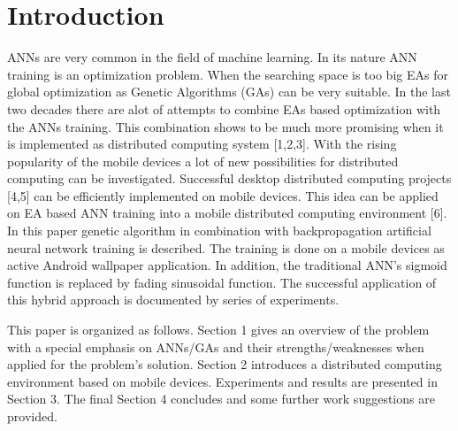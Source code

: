 \documentclass{llncs}
\begin{document}
\section{Introduction}
%
ANNs are very common in the field of machine learning. In its nature ANN training is an optimization problem. When the searching space is too big EAs for global optimization as Genetic Algorithms (GAs) can be very suitable. In the last two decades there are alot of attempts to combine EAs based optimization with the ANNs training. This combination shows to be much more promising when it is implemented as distributed computing system [1,2,3]. With the rising popularity of the mobile devices a lot of new possibilities for distributed computing can be investigated. Successful desktop distributed computing projects [4,5] can be efficiently implemented on mobile devices. This idea can be applied on EA based ANN training into a mobile distributed computing environment [6]. In this paper genetic algorithm in combination with backpropagation artificial neural network training is described. The training is done on a mobile devices as active Android wallpaper application. In addition, the traditional ANN's sigmoid function is replaced by fading sinusoidal function. The successful application of this hybrid approach is documented by series of experiments.

This paper is organized as follows. Section 1 gives an overview of the problem  with a special emphasis on ANNs/GAs and their strengths/weaknesses when applied for the problem's solution. Section 2 introduces a distributed computing environment based on mobile devices. Experiments and results are presented in Section 3. The final Section 4 concludes and some further work suggestions are provided. 
%
\end{document}
